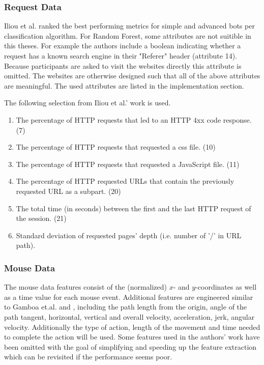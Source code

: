 \documentclass[
    fontsize=12pt,
    headings=small,
    parskip=half,           %
    bibliography=totoc,
    numbers=noenddot,       %
    open=any,               %
    final                   %
]{scrreprt}
\begin{document}
\subsubsection{Request Data}

Iliou et al. \cite{10.1145/3339252.3339267} ranked the best performing metrics for simple and advanced bots per classification algorithm. For Random Forest, some attributes are not suitible in this theses. For example the authors include a boolean indicating whether a request has a known search engine in their "Referer" header (attribute 14). Because participants are asked to visit the websites directly this attribute is omitted. The websites are otherwise designed such that all of the above attributes are meaningful. The used attributes are listed in the implementation section.

The following selection from Iliou et al.' work \cite{10.1145/3339252.3339267} is used.

\begin{enumerate}
	\item The percentage of HTTP requests that led to an HTTP 4xx code response. (7)
	\item The percentage of HTTP requests that requested a css file. (10)
	\item The percentage of HTTP requests that requested a JavaScript file. (11)
	\item The percentage of HTTP requested URLs that contain the previously requested URL as a subpart. (20)
	\item The total time (in seconds) between the first and the last HTTP request of the session. (21)
	\item Standard deviation of requested pages' depth (i.e. number of ’/’ in URL path).
\end{enumerate}

\label{concept_mouse_data}
\subsubsection{Mouse Data}

The mouse data features consist of the (normalized) $x$- and $y$-coordinates as well as a time value for each mouse event. Additional features are engineered similar to Gamboa et.al.\cite{GAMBOA2004} and \cite{https://doi.org/10.1049/iet-bmt.2018.5126}, including the path length from the origin, angle of the path tangent, horizontal, vertical and overall velocity, acceleration, jerk, angular velocity. Additionally the type of action, length of the movement and time needed to complete the action will be used. Some features used in the authors' work have been omitted with the goal of simplifying and speeding up the feature extraction which can be revisited if the performance seems poor.
\end{document}
